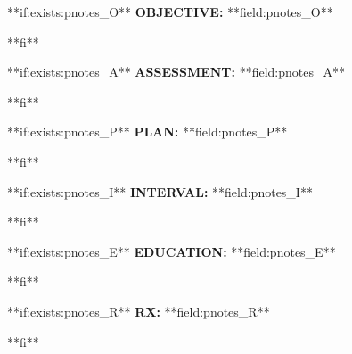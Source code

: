 \documentclass{article}
\newcommand{\sheading}[1]{\textbf{#1:}}
\begin{document}
**if:exists:pnotes_O**
\sheading{OBJECTIVE} **field:pnotes_O**
\par
**fi**

**if:exists:pnotes_A**
\sheading{ASSESSMENT} **field:pnotes_A**
\par
**fi**

**if:exists:pnotes_P**
\sheading{PLAN} **field:pnotes_P**
\par
**fi**

**if:exists:pnotes_I**
\sheading{INTERVAL} **field:pnotes_I**
\par
**fi**

**if:exists:pnotes_E**
\sheading{EDUCATION} **field:pnotes_E**
\par
**fi**

**if:exists:pnotes_R**
\sheading{RX} **field:pnotes_R**
\par
**fi**
\end{document}
